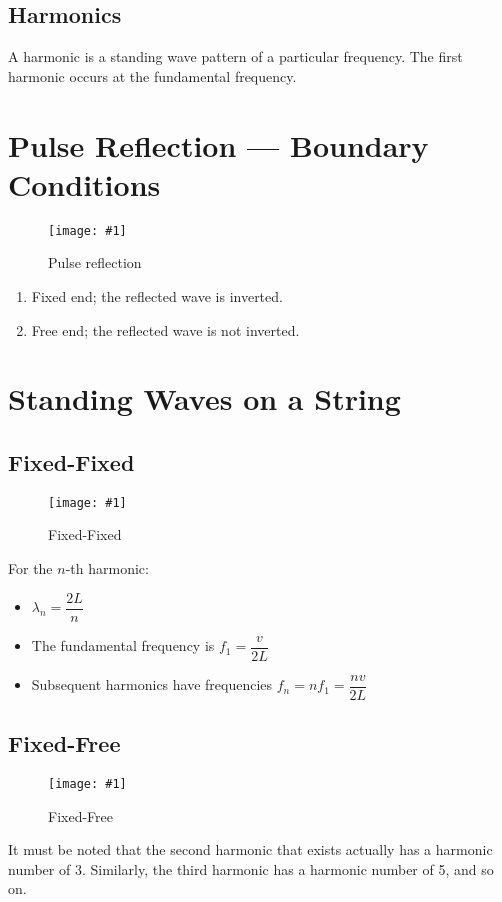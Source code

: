 \documentclass[a4paper,12pt]{article}
\let\oldsection\section
\renewcommand\section{\clearpage\oldsection}
\newcommand{\img}[4]{\begin{center}
  \begin{figure}[H]
    \centering
    \texttt{[image: \#1]}
    \caption{#3}
    \label{fig:#4}
  \end{figure}
\end{center}}
\begin{document}
\subsection{Harmonics}

A harmonic is a standing wave pattern of a particular frequency. The first harmonic occurs at the fundamental frequency.


\section{Pulse Reflection --- Boundary Conditions}
\img{pulse.png}{0.8}{Pulse reflection}{pulse}

\begin{enumerate}
  \item Fixed end; the reflected wave is inverted.
  \item Free end; the reflected wave is not inverted.
\end{enumerate}

\section{Standing Waves on a String}

\subsection{Fixed-Fixed}

\img{string1.png}{0.65}{Fixed-Fixed}{string1}

For the $n$-th harmonic:
\begin{itemize}
  \item $\lambda_n = \dfrac{2L}{n}$
  \item The fundamental frequency is $f_1 = \dfrac{v}{2L}$
  \item Subsequent harmonics have frequencies $f_n = nf_1 = \dfrac{nv}{2L}$
\end{itemize}

\pagebreak

\subsection{Fixed-Free}

\img{string2.png}{0.65}{Fixed-Free}{string2}

It must be noted that the second harmonic that exists actually has a harmonic number of 3. Similarly, the third harmonic has a harmonic number of 5, and so on.
\end{document}
